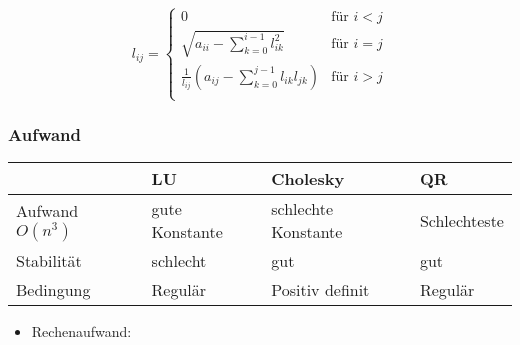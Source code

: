 \begin{displaymath}
	l_{ij} =
	\begin{cases}
		0 & \text{für } i<j \\
		\sqrt{a_{ii} - \sum_{k=0}^{i-1}l_{ik}^2} & \text{für } i=j \\
		\frac{1}{l_{ij}} (a_{ij} - \sum_{k=0}^{j-1}l_{ik}l_{jk}) & \text{für } i>j \\
	\end{cases}
\end{displaymath}

\subsubsection*{Aufwand}
\begin{tabular}{l | l | l | l}

	& LU & Cholesky & QR \\
	\hline
	Aufwand $O(n^3)$ & gute Konstante & schlechte Konstante & Schlechteste \\
	Stabilität & schlecht & gut & gut \\
	Bedingung & Regulär & Positiv definit & Regulär \\

\end{tabular}
\begin{itemize}

	\item Rechenaufwand: 

\end{itemize}

